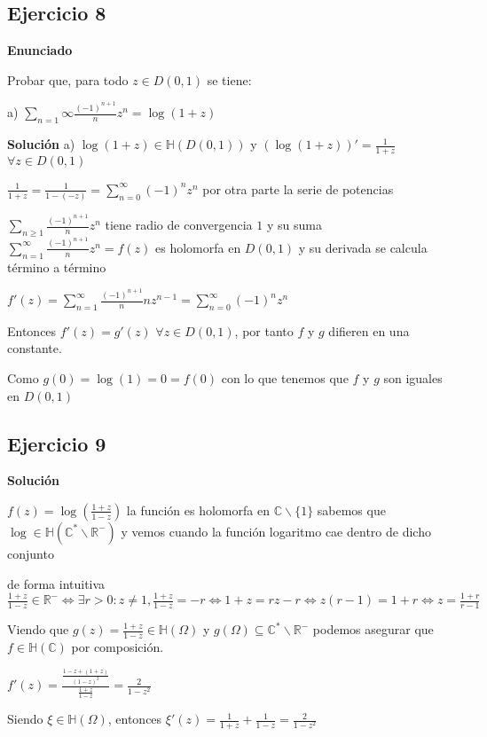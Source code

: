 \subsection{Ejercicio 8}
\textbf{Enunciado}

Probar que, para todo $z \in D(0, 1)$ se tiene:

a) $\sum_{n=1}{\infty} \frac{(-1)^{n+1}}{n} z^n = \log(1+z)$


\textbf{Solución}
a)
$\log (1+z) \in\mathbb{H}(D(0,1))$ y $(\log (1+z))' = \frac{1}{1+z}$ $\forall z\in D(0,1)$

$\frac{1}{1+z} = \frac{1}{1-(-z)} = \sum_{n=0}^{\infty} (-1)^n z^n$
por otra parte la serie de potencias 

$\sum_{n\geq 1} \frac{(-1)^{n+1}}{n} z^n$ tiene radio de convergencia $1$
y su suma $\sum_{n=1}^{\infty} \frac{(-1)^{n+1}}{n} z^n = f(z)$ es holomorfa en $D(0,1)$ y su derivada se calcula término a término

$f'(z) = \sum_{n=1}^{\infty} \frac{(-1)^{n+1}}{n} n z^{n-1} = \sum_{n=0}^{\infty} (-1)^{n}z^{n}$

Entonces $f'(z) = g'(z)$ $\forall z\in D(0,1)$, por tanto $f$ y $g$ difieren en una constante.

Como $g(0) = \log(1) = 0 = f(0)$
con lo que tenemos que $f$ y $g$ son iguales en $D(0,1)$



\subsection{Ejercicio 9}


\textbf{Solución}

$f(z) = \log(\frac{1+z}{1-z})$
la función es holomorfa en $\mathbb{C}\backslash \{1\}$
sabemos que $\log \in \mathbb{H}(\mathbb{C}^{\ast}\backslash\mathbb{R}^-)$
y vemos cuando la función logaritmo cae dentro de dicho conjunto

de forma intuitiva
$\frac{1+z}{1-z} \in\mathbb{R}^- \Longleftrightarrow \exists r>0 : z\not=1, \frac{1+z}{1-z} = -r \Longleftrightarrow 1+z = rz-r \Longleftrightarrow z(r-1)=1+r \Longleftrightarrow z = \frac{1+r}{r-1}$

Viendo que
$g(z) = \frac{1+z}{1-z} \in\mathbb{H}(\Omega)$ y $g(\Omega) \subseteq \mathbb{C}^{\ast}\backslash \mathbb{R}^-$
podemos asegurar que $f\in\mathbb{H}(\mathbb{C})$ por composición.

$f'(z) = \frac{ \frac{1-z+(1+z)}{(1-z)^2} }{ \frac{1+z}{1-z} } = \frac{2}{1-z^2}$

Siendo $\xi\in\mathbb{H}(\Omega)$, entonces
$\xi '(z) = \frac{1}{1+z} + \frac{1}{1-z} = \frac{2}{1-z^2}$



